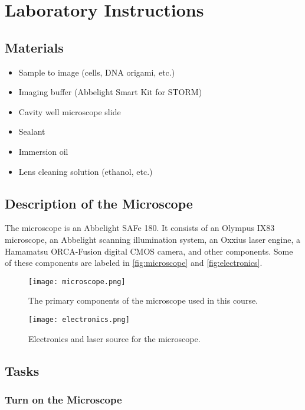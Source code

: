 \documentclass[10pt,a4paper,oneside]{book}
\begin{document}
\chapter{Laboratory Instructions}

\section{Materials}

\begin{itemize}
    \item{Sample to image (cells, DNA origami, etc.)}
    \item{Imaging buffer (Abbelight Smart Kit for STORM)}
    \item{Cavity well microscope slide}
    \item{Sealant}
    \item{Immersion oil}
    \item{Lens cleaning solution (ethanol, etc.)}
\end{itemize}

\section{Description of the Microscope}

The microscope is an Abbelight SAFe 180. It consists of an Olympus IX83 microscope, an Abbelight scanning illumination system, an Oxxius laser engine, a Hamamatsu ORCA-Fusion digital CMOS camera, and other components. Some of these components are labeled in \autoref{fig:microscope} and \autoref{fig:electronics}.

\begin{figure}[ht]
    \centering
    \texttt{[image: microscope.png]}
    \caption{The primary components of the microscope used in this course.}
    \label{fig:microscope}
\end{figure}

\begin{figure}[ht]
    \centering
    \texttt{[image: electronics.png]}
    \caption{Electronics and laser source for the microscope.}
    \label{fig:electronics}
\end{figure}

\section{Tasks}

\subsection{Turn on the Microscope}\label{sec:startup}
\end{document}

